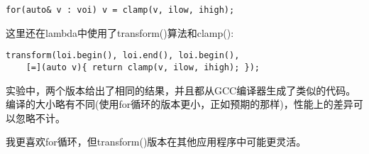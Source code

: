 \begin{lstlisting}[style=styleCXX]
for(auto& v : voi) v = clamp(v, ilow, ihigh);
\end{lstlisting}

这里还在lambda中使用了transform()算法和clamp():

\begin{lstlisting}[style=styleCXX]
transform(loi.begin(), loi.end(), loi.begin(),
	[=](auto v){ return clamp(v, ilow, ihigh); });
\end{lstlisting}

实验中，两个版本给出了相同的结果，并且都从GCC编译器生成了类似的代码。编译的大小略有不同(使用for循环的版本更小，正如预期的那样)，性能上的差异可以忽略不计。

我更喜欢for循环，但transform()版本在其他应用程序中可能更灵活。
